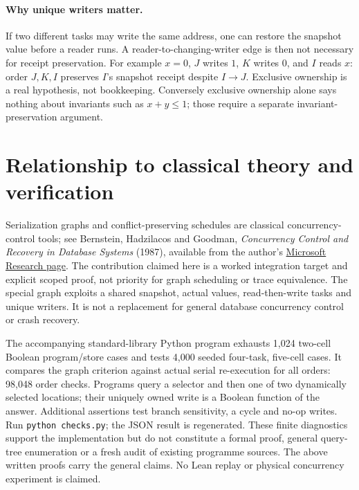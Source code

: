 \documentclass[11pt]{article}
\begin{document}
\paragraph{Why unique writers matter.}
If two different tasks may write the same address, one can restore the snapshot value before a reader runs. A reader-to-changing-writer edge is then not necessary for receipt preservation. For example $x=0$, $J$ writes $1$, $K$ writes $0$, and $I$ reads $x$: order $J,K,I$ preserves $I$'s snapshot receipt despite $I\to J$. Exclusive ownership is a real hypothesis, not bookkeeping. Conversely exclusive ownership alone says nothing about invariants such as $x+y\le1$; those require a separate invariant-preservation argument.
\section{Relationship to classical theory and verification}
Serialization graphs and conflict-preserving schedules are classical concurrency-control tools; see Bernstein, Hadzilacos and Goodman, \emph{Concurrency Control and Recovery in Database Systems} (1987), available from the author's \href{https://www.microsoft.com/en-us/research/people/philbe/book/}{Microsoft Research page}. The contribution claimed here is a worked integration target and explicit scoped proof, not priority for graph scheduling or trace equivalence. The special graph exploits a shared snapshot, actual values, read-then-write tasks and unique writers. It is not a replacement for general database concurrency control or crash recovery.

The accompanying standard-library Python program exhausts 1,024 two-cell Boolean program/store cases and tests 4,000 seeded four-task, five-cell cases. It compares the graph criterion against actual serial re-execution for all orders: 98,048 order checks. Programs query a selector and then one of two dynamically selected locations; their uniquely owned write is a Boolean function of the answer. Additional assertions test branch sensitivity, a cycle and no-op writes. Run \texttt{python checks.py}; the JSON result is regenerated. These finite diagnostics support the implementation but do not constitute a formal proof, general query-tree enumeration or a fresh audit of existing programme sources. The above written proofs carry the general claims. No Lean replay or physical concurrency experiment is claimed.
\end{document}
